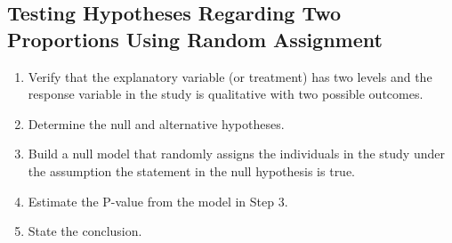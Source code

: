 \documentclass{report}
\begin{document}
    \subsection*{Testing Hypotheses Regarding Two Proportions Using Random Assignment}
    \bigbreak \noindent 
    \begin{enumerate}
        \item Verify that the explanatory variable (or treatment) has two levels and the response variable in the study is qualitative with two possible outcomes.
        \item Determine the null and alternative hypotheses. 
        \item Build a null model that randomly assigns the individuals in the study under the assumption the statement in the null hypothesis is true.
        \item Estimate the P-value from the model in Step 3.
        \item State the conclusion.
    \end{enumerate}

    \pagebreak 
\end{document}
